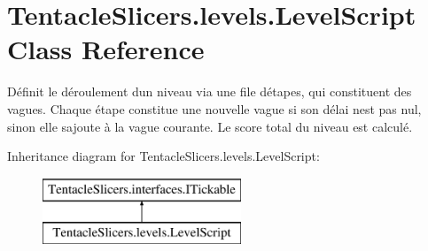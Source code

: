 \hypertarget{class_tentacle_slicers_1_1levels_1_1_level_script}{}\section{Tentacle\+Slicers.\+levels.\+Level\+Script Class Reference}
\label{class_tentacle_slicers_1_1levels_1_1_level_script}


Définit le déroulement d\textquotesingle{}un niveau via une file d\textquotesingle{}étapes, qui constituent des vagues. Chaque étape constitue une nouvelle vague si son délai n\textquotesingle{}est pas nul, sinon elle s\textquotesingle{}ajoute à la vague courante. Le score total du niveau est calculé.  


Inheritance diagram for Tentacle\+Slicers.\+levels.\+Level\+Script\+:\begin{figure}[H]
\begin{center}
\leavevmode
\includegraphics[height=2.000000cm]{class_tentacle_slicers_1_1levels_1_1_level_script}
\end{center}
\end{figure}
